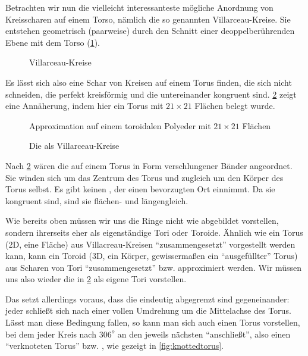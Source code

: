 Betrachten wir nun die vielleicht interessanteste mögliche Anordnung von Kreisscharen auf einem Torso, nämlich die so genannten Villarceau-Kreise. Sie entstehen geometrisch (paarweise) durch den Schnitt einer deoppelberührenden Ebene mit dem Torso (\cref{fig:villarceaukreise}).

\begin{figure}[ht!]
    \centering
    
    \caption{Villarceau-Kreise \cite{villarceauag2gaeh}}
    \label{fig:villarceaukreise}
\end{figure}

Es lässt sich also eine Schar von Kreisen auf einem Torus finden, die sich nicht schneiden, die perfekt kreisförmig und die untereinander kongruent sind. \cref{fig:villarceautorous} zeigt eine Annäherung, indem hier ein Torus mit $21\times 21$ Flächen belegt wurde.

\begin{figure}[ht!] 
    \centering
                        
    \caption{Die  als Villarceau-Kreise} Approximation auf einem toroidalen Polyeder mit $21\times21$ Flächen
    \label{fig:villarceautorous}
\end{figure}


Nach \cref{fig:villarceautorous} wären die  auf einem Torus in Form verschlungener Bänder angeordnet. Sie winden sich um das Zentrum des Torus und zugleich um den Körper des Torus selbst. 
Es gibt keinen , der einen bevorzugten Ort einnimmt. Da sie kongruent sind, sind sie flächen- und längengleich.


Wie bereits oben müssen wir uns die Ringe nicht wie abgebildet vorstellen, sondern ihrerseits eher als eigenständige Tori oder Toroide. Ähnlich wie ein Torus (2D, eine Fläche) aus Villacreau-Kreisen "`zusammengesetzt"' vorgestellt werden kann, kann ein Toroid (3D, ein Körper, gewissermaßen ein "`ausgefüllter"' Torus) aus Scharen von Tori "`zusammengesetzt"' bzw. approximiert werden. Wir müssen uns also wieder die  in \cref{fig:villarceautorous} als eigene Tori vorstellen.

Das setzt allerdings voraus, dass die  eindeutig abgegrenzt sind gegeneinander: jeder  schließt sich nach einer vollen Umdrehung um die Mittelachse des Torus. Lässt man diese Bedingung fallen, so kann man sich auch einen Torus vorstellen, bei dem jeder Kreis nach $306^o$ an den jeweils nächsten "`anschließt"', also einen "`verknoteten Torus"' bzw. , wie gezeigt in \cref{fig:knottedtorus}.

